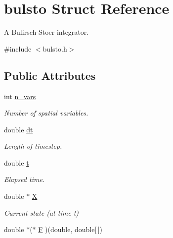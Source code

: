 \hypertarget{structbulsto}{}\section{bulsto Struct Reference}
\label{structbulsto}


A Bulirsch-\/\+Stoer integrator.  




{\ttfamily \#include $<$bulsto.\+h$>$}

\subsection*{Public Attributes}
\begin{DoxyCompactItemize}
\item 
\hypertarget{structbulsto_a4644ac965956cf8a34a102aa42882fa9}{}int \hyperlink{structbulsto_a4644ac965956cf8a34a102aa42882fa9}{n\+\_\+vars}\label{structbulsto_a4644ac965956cf8a34a102aa42882fa9}

\begin{DoxyCompactList}\small\item\em Number of spatial variables. \end{DoxyCompactList}\item 
\hypertarget{structbulsto_a36056008e687384ae776b011c92a8536}{}double \hyperlink{structbulsto_a36056008e687384ae776b011c92a8536}{dt}\label{structbulsto_a36056008e687384ae776b011c92a8536}

\begin{DoxyCompactList}\small\item\em Length of timestep. \end{DoxyCompactList}\item 
\hypertarget{structbulsto_a3553c5b225bd39d4f8e797ea958f8b3b}{}double \hyperlink{structbulsto_a3553c5b225bd39d4f8e797ea958f8b3b}{t}\label{structbulsto_a3553c5b225bd39d4f8e797ea958f8b3b}

\begin{DoxyCompactList}\small\item\em Elapsed time. \end{DoxyCompactList}\item 
\hypertarget{structbulsto_a110de2f76d66addd0c11b3c1cf896557}{}double $\ast$ \hyperlink{structbulsto_a110de2f76d66addd0c11b3c1cf896557}{X}\label{structbulsto_a110de2f76d66addd0c11b3c1cf896557}

\begin{DoxyCompactList}\small\item\em Current state (at time t) \end{DoxyCompactList}\item 
\hypertarget{structbulsto_a8b6f5733863e9f0ce2179bc45a58902b}{}double $\ast$($\ast$ \hyperlink{structbulsto_a8b6f5733863e9f0ce2179bc45a58902b}{F} )(double, double\mbox{[}$\,$\mbox{]})\label{structbulsto_a8b6f5733863e9f0ce2179bc45a58902b}


\end{DoxyCompactItemize}
